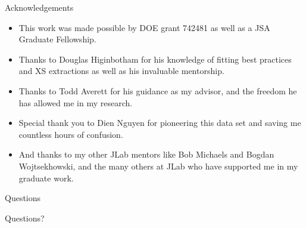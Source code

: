 \documentclass[10pt]{beamer}
\begin{document}
\begin{frame}[fragile]{Acknowledgements}

	\begin{itemize}
		\item This work was made possible by \alert{DOE} grant 742481 as well as a \alert{JSA Graduate Fellowship}.
		\item Thanks to \alert{Douglas Higinbotham} for his knowledge of fitting best practices and XS extractions as well as his invaluable mentorship.
		\item Thanks to \alert{Todd Averett} for his guidance as my advisor, and the freedom he has allowed me in my research.
		\item Special thank you to \alert{Dien Nguyen} for pioneering this data set and saving me countless hours of confusion.
		\item And thanks to my other JLab mentors like \alert{Bob Michaels} and \alert{Bogdan Wojtsekhowski}, and the many others at JLab who have supported me in my graduate work.
	\end{itemize}

\end{frame}

\begin{frame}[fragile]{Questions}

	\begin{center}
		\Huge{\alert{Questions?}}	
	\end{center}

\end{frame}
\end{document}
